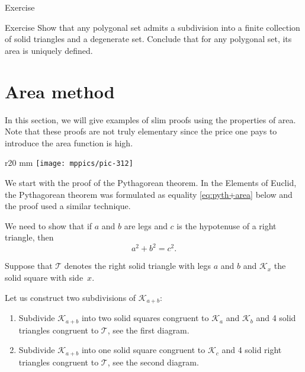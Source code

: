 {\begin{thm}{Exercise}
\end{thm}



\begin{thm}{Exercise}\label{ex:subdivision}
Show that any polygonal set admits a subdivision into a finite collection of solid triangles and a degenerate set.
Conclude that for any polygonal set, its area is uniquely defined.
\end{thm}




\section*{Area method}

In this section, we will give examples of
slim proofs using the properties of area.
Note that these proofs are not truly elementary since the price one pays to introduce the area function is high.

{

\begin{wrapfigure}{r}{20 mm}
\vskip-2mm
\centering
\texttt{[image: mppics/pic-312]}
\end{wrapfigure}

We start with the proof of the Pythagorean theorem.
In the Elements of Euclid, the Pythagorean theorem was formulated as equality  \ref{eq:pyth+area} below
and the proof used a similar technique.

We need to show that 
if $a$ and $b$ are legs and $c$ is the hypotenuse 
of a right triangle, then
\[a^2+b^2=c^2.\]

Suppose that $\mathcal{T}$ denotes the right solid triangle with legs $a$ and $b$
and $\mathcal{K}_{x}$  the solid square with side~$x$.

}

Let us construct two subdivisions of $\mathcal{K}_{a+b}$:
\begin{enumerate}[1.]
\item Subdivide $\mathcal{K}_{a+b}$ into two solid squares congruent to $\mathcal{K}_a$ and $\mathcal{K}_b$
and 4 solid triangles congruent to $\mathcal{T}$,
see the first diagram.

\item Subdivide $\mathcal{K}_{a+b}$ into one solid square congruent to $\mathcal{K}_c$
and 4 solid right triangles congruent to $\mathcal{T}$,
see the second diagram.

\end{enumerate}

}
